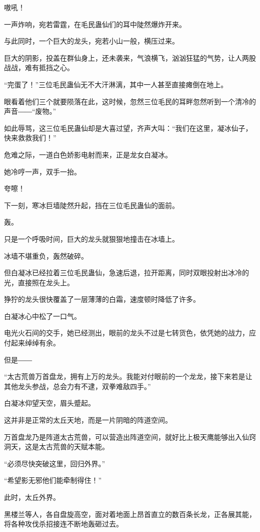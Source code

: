 
\begin{this_body}

嗷吼！

一声炸响，宛若雷霆，在毛民蛊仙们的耳中陡然爆炸开来。

与此同时，一个巨大的龙头，宛若小山一般，横压过来。

巨大的阴影，投盖在群仙身上，还未袭来，气浪横飞，汹汹狂猛的气势，让人两股战战，难有抵挡之心。

“完蛋了！”三位毛民蛊仙无不大汗淋漓，其中一人甚至直接瘫倒在地上。

眼看着他们三个就要陨落在此，这时候，忽然三位毛民的耳畔忽然听到一个清冷的声音――“废物。”

如此辱骂，这三位毛民蛊仙却是大喜过望，齐声大叫：“我们在这里，凝冰仙子，快来救救我们！”

危难之际，一道白色娇影电射而来，正是龙女白凝冰。

她冷哼一声，双手一抬。

夸嚓！

下一刻，寒冰巨墙陡然升起，挡在三位毛民蛊仙的面前。

轰。

只是一个呼吸时间，巨大的龙头就狠狠地撞击在冰墙上。

冰墙不堪重负，轰然破碎。

但白凝冰已经拉着三位毛民蛊仙，急速后退，拉开距离，同时双眼投射出冰冷的光，直接照在龙头上。

狰狞的龙头很快覆盖了一层薄薄的白霜，速度顿时降低了许多。

白凝冰心中松了一口气。

电光火石间的交手，她已经测出，眼前的龙头不过是七转货色，依凭她的战力，应付起来绰绰有余。

但是――

“太古荒兽万首盘龙，拥有上万的龙头。我能对付眼前的一个龙龙，接下来若是让其他龙头参战，总会力有不逮，双拳难敌四手。”

白凝冰仰望天空，眉头蹙起。

这并非是正常的太丘天地，而是一片阴暗的阵道空间。

万首盘龙乃是阵道太古荒兽，可以营造出阵道空间，就好比上极天鹰能够出入仙窍洞天，这是太古荒兽的天赋本能。

“必须尽快突破这里，回归外界。”

“希望影无邪他们能牵制得住！”

此时，太丘外界。

黑楼兰等人，各自盘旋高空，面对着地面上昂首直立的数百条长龙，正各展其能，将各种攻伐杀招接连不断地轰砸过去。


\end{this_body}

